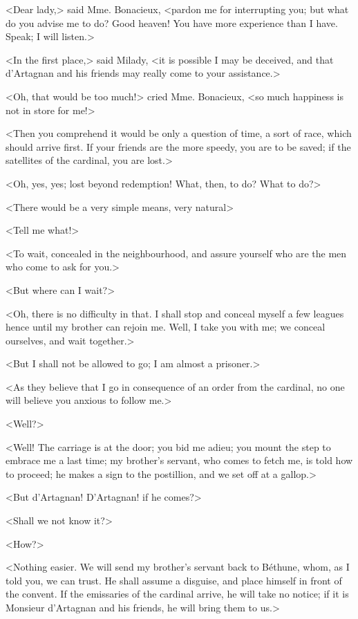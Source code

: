 <Dear lady,> said Mme. Bonacieux, <pardon me for interrupting you; but what do you advise me to do? Good heaven! You have more experience than I have. Speak; I will listen.> 

<In the first place,> said Milady, <it is possible I may be deceived, and that d'Artagnan and his friends may really come to your assistance.> 

<Oh, that would be too much!> cried Mme. Bonacieux, <so much happiness is not in store for me!> 

<Then you comprehend it would be only a question of time, a sort of race, which should arrive first. If your friends are the more speedy, you are to be saved; if the satellites of the cardinal, you are lost.> 

<Oh, yes, yes; lost beyond redemption! What, then, to do? What to do?> 

<There would be a very simple means, very natural\longdash> 

<Tell me what!> 

<To wait, concealed in the neighbourhood, and assure yourself who are the men who come to ask for you.> 

<But where can I wait?> 

<Oh, there is no difficulty in that. I shall stop and conceal myself a few leagues hence until my brother can rejoin me. Well, I take you with me; we conceal ourselves, and wait together.> 

<But I shall not be allowed to go; I am almost a prisoner.> 

<As they believe that I go in consequence of an order from the cardinal, no one will believe you anxious to follow me.> 

<Well?> 

<Well! The carriage is at the door; you bid me adieu; you mount the step to embrace me a last time; my brother's servant, who comes to fetch me, is told how to proceed; he makes a sign to the postillion, and we set off at a gallop.> 

<But d'Artagnan! D'Artagnan! if he comes?> 

<Shall we not know it?> 

<How?> 

<Nothing easier. We will send my brother's servant back to Béthune, whom, as I told you, we can trust. He shall assume a disguise, and place himself in front of the convent. If the emissaries of the cardinal arrive, he will take no notice; if it is Monsieur d'Artagnan and his friends, he will bring them to us.> 

